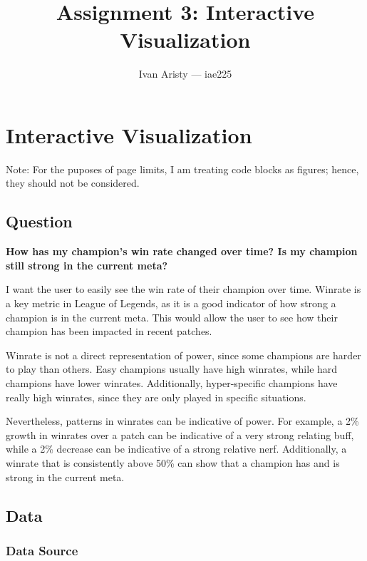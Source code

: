 \documentclass{article}
\title{Assignment 3: Interactive Visualization}
\author{Ivan Aristy — iae225}
\begin{document}
  \maketitle %
  \thispagestyle{empty}

\section{Interactive Visualization}
\label{sec:sec1}

Note: For the puposes of page limits,
I am treating code blocks as figures; 
hence, they should not be considered.

\subsection{Question }
\label{subsec:subsec1}

\textbf{How has my champion's win rate changed over time? Is my champion still strong in the current meta?}

I want the user to easily see the win rate of their champion over time. 
Winrate is a key metric in League of Legends, as it is a good indicator of how strong a champion is in the current meta.
This would allow the user to see how their champion has been impacted in recent patches.

Winrate is not a direct representation of power, since some champions are harder to play than others.
Easy champions usually have high winrates, while hard champions have lower winrates.
Additionally, hyper-specific champions have really high winrates, since they are only played in specific situations.

Nevertheless, patterns in winrates can be indicative of power. For example, a 2\% growth in winrates
over a patch can be indicative of a very strong relating buff, while a 2\% decrease can be indicative of a strong relative nerf.
Additionally, a winrate that is consistently above 50\% can show that a champion has and is strong in the current meta.

\subsection{Data}
\label{subsec:subsec2}

\subsubsection{Data Source}
\label{subsubsec:Data Source}
\end{document}
